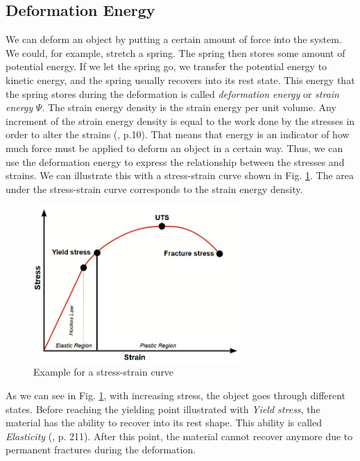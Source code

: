 \subsection{Deformation Energy}
\label{ss:deformation_energy}
We can deform an object by putting a certain amount of force into the system. We could, for example, stretch a spring. The spring then stores some amount of potential energy. If we let the spring go, we transfer the potential energy to kinetic energy, and the spring usually recovers into its rest state. This energy that the spring stores during the deformation is called \textit{deformation energy} or \textit{strain energy} $\Psi$. The strain energy density is the strain energy per unit volume. Any increment of the strain energy density is equal to the work done by the stresses in order to alter the strains (\cite{KORSUNSKY20175}, p.10). That means that energy is an indicator of how much force must be applied to deform an object in a certain way. Thus, we can use the deformation energy to express the relationship between the stresses and strains. We can illustrate this with a stress-strain curve shown in Fig. \ref{fig:stress_strain}. The area under the stress-strain curve corresponds to the strain energy density.
\newpage
\begin{figure}[!htbp]
	\centering
	\includegraphics[width=0.7\textwidth]{resources/stress_strain_curve_final.png}
	\caption[Stress-strain curve]{Example for a stress-strain curve\footnotemark}
	\label{fig:stress_strain}
\end{figure}

As we can see in Fig. \ref{fig:stress_strain}, with increasing stress, the object goes through different states. Before reaching the yielding point illustrated with \textit{Yield stress}, the material has the ability to recover into its rest shape. This ability is called \textit{Elasticity} (\cite{BERGSTROM2015209}, p. 211). After this point, the material cannot recover anymore due to permanent fractures during the deformation.

